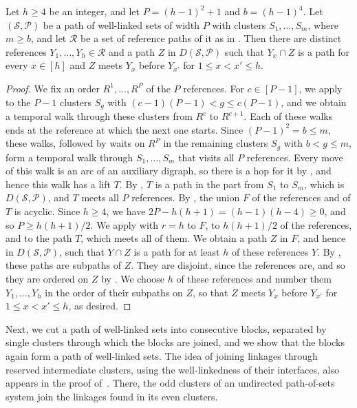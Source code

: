 \documentclass[fontsize=12pt,leading=14pt]{fullpaper}
\newcommand{\Pcal}{\mathcal{P}}
\newcommand{\Rcal}{\mathcal{R}}
\newcommand{\Scal}{\mathcal{S}}
\begin{document}
\begin{lemma}\label{lem:s3-column}
  Let $h\ge4$ be an integer, and let $P=(h-1)^2+1$ and $b=(h-1)^4$.
  Let $(\Scal,\Pcal)$ be a path of well-linked sets of width $P$ with clusters $S_1,\dots,S_m$, where $m\ge b$, and let $\Rcal$ be a set of reference paths of it as in .
  Then there are distinct references $Y_1,\dots,Y_h\in\Rcal$ and a path $Z$ in $D(\Scal,\Pcal)$ such that $Y_x\cap Z$ is a path for every $x\in[h]$ and $Z$ meets $Y_x$ before $Y_{x'}$ for $1\le x<x'\le h$.
\end{lemma}

\begin{proof}
  We fix an order $R^1,\dots,R^P$ of the $P$ references.
  For $c\in[P-1]$, we apply  to the $P-1$ clusters $S_g$ with $(c-1)(P-1)<g\le c(P-1)$, and we obtain a temporal walk through these clusters from $R^c$ to $R^{c+1}$.
  Each of these walks ends at the reference at which the next one starts.
  Since $(P-1)^2=b\le m$, these walks, followed by waits on $R^P$ in the remaining clusters $S_g$ with $b<g\le m$, form a temporal walk through $S_1,\dots,S_m$ that visits all $P$ references.
  Every move of this walk is an arc of an auxiliary digraph, so there is a hop for it by , and hence this walk has a lift $T$.
  By , $T$ is a path in the part from $S_1$ to $S_m$, which is $D(\Scal,\Pcal)$, and $T$ meets all $P$ references.
  By , the union $F$ of the references and of $T$ is acyclic.
  Since $h\ge4$, we have $2P-h(h+1)=(h-1)(h-4)\ge0$, and so $P\ge h(h+1)/2$.
  We apply  with $r=h$ to $F$, to $h(h+1)/2$ of the references, and to the path $T$, which meets all of them.
  We obtain a path $Z$ in $F$, and hence in $D(\Scal,\Pcal)$, such that $Y\cap Z$ is a path for at least $h$ of these references $Y$.
  By , these paths are subpaths of $Z$.
  They are disjoint, since the references are, and so they are ordered on $Z$ by .
  We choose $h$ of these references and number them $Y_1,\dots,Y_h$ in the order of their subpaths on $Z$, so that $Z$ meets $Y_x$ before $Y_{x'}$ for $1\le x<x'\le h$, as desired.
\end{proof}

Next, we cut a path of well-linked sets into consecutive blocks, separated by single clusters through which the blocks are joined, and we show that the blocks again form a path of well-linked sets.
The idea of joining linkages through reserved intermediate clusters, using the well-linkedness of their interfaces, also appears in the proof of~\cite[Corollary~3.2]{CC16}.
There, the odd clusters of an undirected path-of-sets system join the linkages found in its even clusters.
\end{document}
